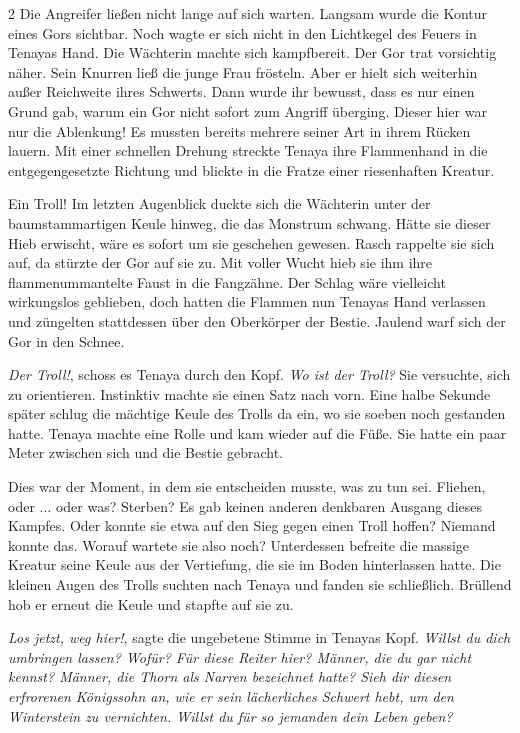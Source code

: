 \documentclass[10pt, a4paper, oneside]{book}
\begin{document}
\begin{multicols}{2}
Die Angreifer ließen nicht lange auf sich warten. Langsam wurde die Kontur eines Gors sichtbar. Noch wagte er sich nicht in den Lichtkegel des Feuers in Tenayas Hand. Die Wächterin machte sich kampfbereit. Der Gor trat vorsichtig näher. Sein Knurren ließ die junge Frau frösteln. Aber er hielt sich weiterhin außer Reichweite ihres Schwerts. Dann wurde ihr bewusst, dass es nur einen Grund gab, warum ein Gor nicht sofort zum Angriff überging. Dieser hier war nur die Ablenkung! Es mussten bereits mehrere seiner Art in ihrem Rücken lauern. Mit einer schnellen Drehung streckte Tenaya ihre Flammenhand in die entgegengesetzte Richtung und blickte in die Fratze einer riesenhaften Kreatur.

Ein Troll! Im letzten Augenblick duckte sich die Wächterin unter der baumstammartigen Keule hinweg, die das Monstrum schwang. Hätte sie dieser Hieb erwischt, wäre es sofort um sie geschehen gewesen. Rasch rappelte sie sich auf, da stürzte der Gor auf sie zu. Mit voller Wucht hieb sie ihm ihre flammenummantelte Faust in die Fangzähne. Der Schlag wäre vielleicht wirkungslos geblieben, doch hatten die Flammen nun Tenayas Hand verlassen und züngelten stattdessen über den Oberkörper der Bestie. Jaulend warf sich der Gor in den Schnee. 

\textit{Der Troll!}, schoss es Tenaya durch den Kopf. \textit{Wo ist der Troll?} Sie versuchte, sich zu orientieren. Instinktiv machte sie einen Satz nach vorn. Eine halbe Sekunde später schlug die mächtige Keule des Trolls da ein, wo sie soeben noch gestanden hatte. Tenaya machte eine Rolle und kam wieder auf die Füße. Sie hatte ein paar Meter zwischen sich und die Bestie gebracht.

Dies war der Moment, in dem sie entscheiden musste, was zu tun sei. Fliehen, oder ... oder was? Sterben? Es gab keinen anderen denkbaren Ausgang dieses Kampfes. Oder konnte sie etwa auf den Sieg gegen einen Troll hoffen? Niemand konnte das. Worauf wartete sie also noch? Unterdessen befreite die massige Kreatur seine Keule aus der Vertiefung, die sie im Boden hinterlassen hatte. Die kleinen Augen des Trolls suchten nach Tenaya und fanden sie schließlich. Brüllend hob er erneut die Keule und stapfte auf sie zu.

\textit{Los jetzt, weg hier!}, sagte die ungebetene Stimme in Tenayas Kopf. \textit{Willst du dich umbringen lassen? Wofür? Für diese Reiter hier? Männer, die du gar nicht kennst? Männer, die Thorn als Narren bezeichnet hatte? Sieh dir diesen erfrorenen Königssohn an, wie er sein lächerliches Schwert hebt, um den Winterstein zu vernichten. Willst du für so jemanden dein Leben geben?}


\end{multicols}
\end{document}
